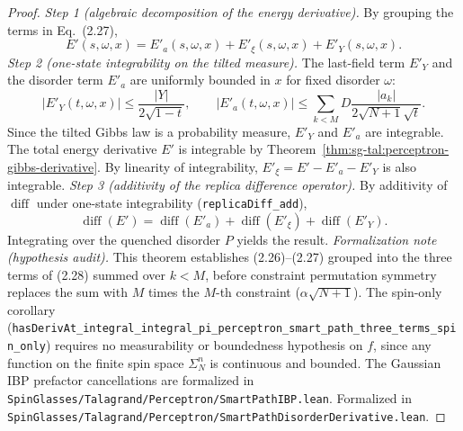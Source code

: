 \begin{proof}
  \leanok
\emph{Step 1 (algebraic decomposition of the energy derivative).}
By grouping the terms in Eq.~(2.27),
\[
 E'(s,\omega,x) = E'_a(s,\omega,x) + E'_\xi(s,\omega,x) + E'_Y(s,\omega,x).
\]
\emph{Step 2 (one-state integrability on the tilted measure).}
The last-field term $E'_Y$ and the disorder term $E'_a$ are uniformly bounded in $x$ for fixed disorder $\omega$:
\[
 |E'_Y(t,\omega,x)| \le \frac{|Y|}{2\sqrt{1-t}}, \qquad
 |E'_a(t,\omega,x)| \le \sum_{k<M} D \frac{|a_k|}{2\sqrt{N+1}\sqrt{t}}.
\]
Since the tilted Gibbs law is a probability measure, $E'_Y$ and $E'_a$ are integrable.
The total energy derivative $E'$ is integrable by Theorem~\ref{thm:sg-tal:perceptron-gibbs-derivative}.
By linearity of integrability, $E'_\xi = E' - E'_a - E'_Y$ is also integrable.
\emph{Step 3 (additivity of the replica difference operator).}
By additivity of $\operatorname{diff}$ under one-state integrability
(\texttt{replicaDiff\_add}),
\[
 \operatorname{diff}(E') = \operatorname{diff}(E'_a) + \operatorname{diff}(E'_\xi) + \operatorname{diff}(E'_Y).
\]
Integrating over the quenched disorder $P$ yields the result.
\emph{Formalization note (hypothesis audit).}
This theorem establishes (2.26)--(2.27) grouped into the three terms of (2.28) summed over
$k < M$, before constraint permutation symmetry replaces the sum with $M$ times the $M$-th
constraint ($\alpha\sqrt{N+1}$). The spin-only corollary
(\texttt{hasDerivAt\_integral\_integral\_pi\_perceptron\_smart\_path\_three\_terms\_spin\_only})
requires no measurability or boundedness hypothesis on $f$, since any function on the finite
spin space $\Sigma_N^n$ is continuous and bounded. The Gaussian IBP prefactor cancellations
are formalized in \texttt{SpinGlasses/Talagrand/Perceptron/SmartPathIBP.lean}.
Formalized in \texttt{SpinGlasses/Talagrand/Perceptron/SmartPathDisorderDerivative.lean}.
\end{proof}

